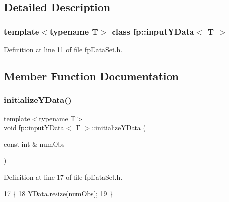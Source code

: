 \subsection{Detailed Description}
\subsubsection*{template$<$typename T$>$\newline
class fp\+::input\+Y\+Data$<$ T $>$}



Definition at line 11 of file fp\+Data\+Set.\+h.



\subsection{Member Function Documentation}
\mbox{\label{classfp_1_1inputYData_a9bb60b2b0070ae39ad53088f1bcf9e87}} 
\subsubsection{\texorpdfstring{initialize\+Y\+Data()}{initializeYData()}}
{\footnotesize\ttfamily template$<$typename T$>$ \\
void \hyperlink{classfp_1_1inputYData}{fp\+::input\+Y\+Data}$<$ T $>$\+::initialize\+Y\+Data (\begin{DoxyParamCaption}\item[{const int \&}]{num\+Obs }\end{DoxyParamCaption})\hspace{0.3cm}{\ttfamily [inline]}}



Definition at line 17 of file fp\+Data\+Set.\+h.


\begin{DoxyCode}
17                                                \{
18             \hyperlink{classfp_1_1inputYData_af9a5f5190739918b5b5b209ef3b18de3}{YData}.resize(numObs);
19         \}
\end{DoxyCode}
\mbox{\label{classfp_1_1inputYData_a6f6c2742745fd59daafef4e51d76400a}} 
